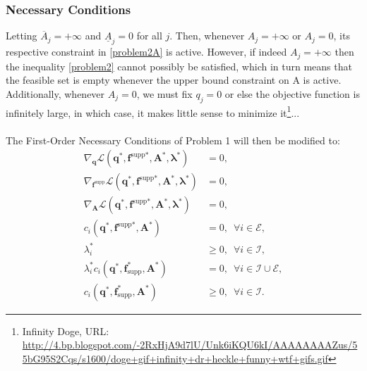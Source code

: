 \documentclass[10pt,a4paper]{article}
\begin{document}
\subsubsection{Necessary Conditions}
Letting $\overline{A}_j = +\infty$ and $\underline{A}_j = 0$ for all $j$. Then, whenever $A_j = +\infty$ or $A_j = 0$, its respective constraint in \eqref{problem2A} is active. However, if indeed $A_j = +\infty$ then the inequality \eqref{problem2} cannot possibly be satisfied, which in turn means that the feasible set is empty whenever the upper bound constraint on A is active. Additionally, whenever $A_j = 0$, we must fix $q_j = 0$ or else the objective function is infinitely large, in which case, it makes little sense to minimize it\footnote{Infinity Doge, URL: \url{http://4.bp.blogspot.com/-2RxHjA9d7lU/Unk6iKQU6kI/AAAAAAAAZus/55bG95S2Cqs/s1600/doge+gif+infinity+dr+heckle+funny+wtf+gifs.gif}}...
\\\\
The First-Order Necessary Conditions of Problem 1 will then be modified to:
\begin{align}\label{additionalgay}
\nabla_{\boldsymbol{q}}\mathcal{L}\left(\boldsymbol{q}^*,\boldsymbol{f}^\text{supp*},\boldsymbol{A}^*,\boldsymbol{\lambda}^*\right) &= 0, \\
\nabla_{\boldsymbol{f}^\text{supp}}\mathcal{L}\left(\boldsymbol{q}^*,\boldsymbol{f}^\text{supp*},\boldsymbol{A}^*,\boldsymbol{\lambda}^*\right) &= 0,\\
\nabla_{\boldsymbol{A}}\mathcal{L}\left(\boldsymbol{q}^*,\boldsymbol{f}^\text{supp*},\boldsymbol{A}^*,\boldsymbol{\lambda}^*\right) &= 0, \\
c_i\left(\boldsymbol{q}^*,\boldsymbol{f}^\text{supp*},\boldsymbol{A}^*\right) &= 0, \enspace \forall i \in \mathcal{E},\\
\lambda_i^* &\geq 0, \enspace \forall i\in\mathcal{I},\\
\lambda_i^* c_i(\boldsymbol{q}^*,\boldsymbol{f}_\text{supp}^*,\boldsymbol{A}^*) &= 0, \enspace \forall i\in\mathcal{I}\cup\mathcal{E},\\
c_i(\boldsymbol{q}^*,\boldsymbol{f}_\text{supp}^*,\boldsymbol{A}^*) &\geq 0, \enspace \forall i\in\mathcal{I}.\label{finalgay}
\end{align}
\end{document}

